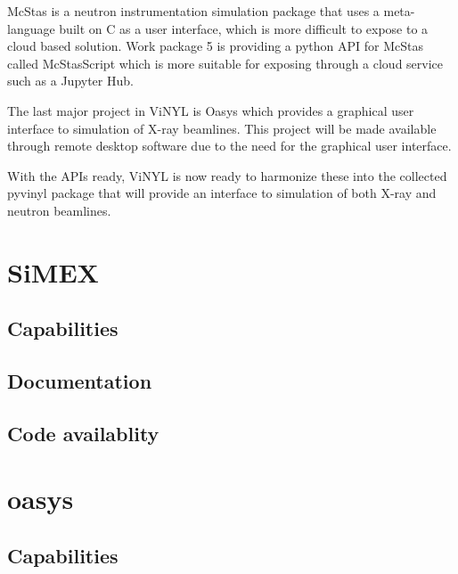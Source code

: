 \documentclass[10pt]{scrartcl}
\begin{document}
McStas is a neutron instrumentation simulation package that uses a meta-language built on C as a user interface, which is more difficult to expose to a cloud based solution. Work package 5 is providing a python API for McStas called McStasScript which is more suitable for exposing through a cloud service such as a Jupyter Hub.

The last major project in ViNYL is Oasys which provides a graphical user interface to simulation of X-ray beamlines. This project will be made available through remote desktop software due to the need for the graphical user interface.

With the APIs ready, ViNYL is now ready to harmonize these into the collected pyvinyl package that will provide an interface to simulation of both X-ray and neutron beamlines.


\section{SiMEX}

\subsection{Capabilities}

\subsection{Documentation}

\subsection{Code availablity}

\section{oasys}

\subsection{Capabilities}
\end{document}

